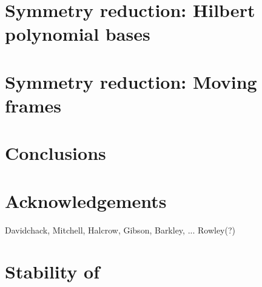 \documentclass[preprint,number,sort&compress]{elsarticle}
\begin{document}
   
   

\section{\label{s:Hilbert} Symmetry reduction: Hilbert polynomial bases}
    
    

\section{\label{sec:mf} Symmetry reduction: Moving frames}
    
    
    
    


\section{Conclusions}
    

\section*{Acknowledgements}
 Davidchack, Mitchell, Halcrow, Gibson, Barkley, ... Rowley(?)

\appendix

\section{\label{s:StabReq} Stability of \reqva}
    

% 



    \newpage
    
    
\end{document}

